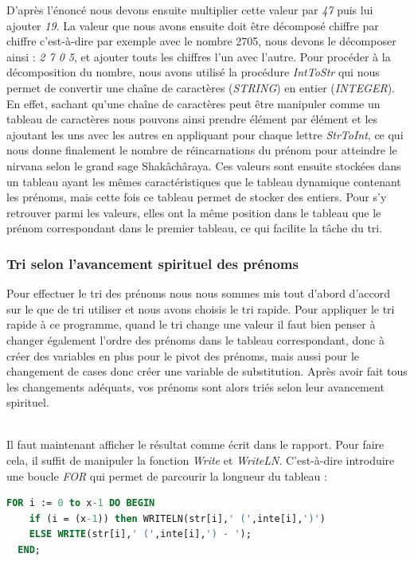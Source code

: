 \documentclass[13pt]{article}
\begin{document}
D'après l'énoncé nous devons ensuite multiplier cette valeur par \emph{47} puis lui ajouter \emph{19}. La valeur que nous avons ensuite doit être décomposé chiffre par chiffre c'est-à-dire par exemple avec le nombre 2705, nous devons le décomposer ainsi : \emph{2 7 0 5}, et ajouter touts les chiffres l'un avec l'autre. Pour procéder à la décomposition du nombre, nous avons utilisé la procédure \emph{IntToStr} qui nous permet de convertir une chaîne de caractères (\emph{STRING}) en entier (\emph{INTEGER}). En effet, sachant qu'une chaîne de caractères peut être manipuler comme un tableau de caractères nous pouvons ainsi prendre élément par élément et les ajoutant les uns avec les autres en appliquant pour chaque lettre \emph{StrToInt}, ce qui nous donne finalement le nombre de réincarnations du prénom pour atteindre le nirvana selon le grand sage Shakâchâraya. Ces valeurs sont ensuite stockées dans un tableau ayant les mêmes caractéristiques que le tableau dynamique contenant les prénoms, mais cette fois ce tableau permet de stocker des entiers. Pour s'y retrouver parmi les valeurs, elles ont la même position dans le tableau que le prénom correspondant dans le premier tableau, ce qui facilite la tâche du tri.
\subsubsection*{Tri selon l'avancement spirituel des prénoms}
Pour effectuer le tri des prénoms nous nous sommes mis tout d’abord d'accord sur le que de tri utiliser et nous avons choisis le tri rapide. Pour appliquer le tri rapide à ce programme, quand le tri change une valeur il faut bien penser à changer également l'ordre des prénoms dans le tableau correspondant, donc à créer des variables en plus pour le pivot des prénoms, mais aussi pour le changement de cases donc créer une variable de substitution.
Après avoir fait tous les changements adéquats, vos prénoms sont alors triés selon leur avancement spirituel.\\
\\
\par
Il faut maintenant afficher le résultat comme écrit dans le rapport. Pour faire cela, il suffit de manipuler la fonction \emph{Write} et \emph{WriteLN}. C'est-à-dire introduire une boucle \emph{FOR} qui permet de parcourir la longueur du tableau : 
\begin{lstlisting}[language=Pascal]
FOR i := 0 to x-1 DO BEGIN
    if (i = (x-1)) then WRITELN(str[i],' (',inte[i],')')
    ELSE WRITE(str[i],' (',inte[i],') - ');
  END;
 \end{lstlisting}
\end{document}
